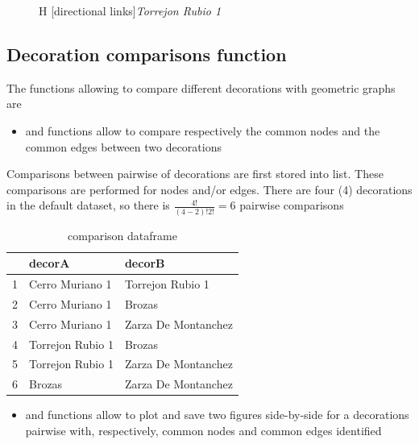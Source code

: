 \documentclass[article]{jss}\usepackage[]{graphicx}\usepackage[]{color}
\newenvironment{knitrout}{}{} %
\begin{document}
\begin{figure}{H}
\begin{knitrout}
\end{knitrout}
[directional links]{\emph{Torrejon Rubio 1}}
\end{figure}

\subsection{Decoration comparisons function} \label{sec:functions_one}

The functions allowing to compare different decorations with geometric graphs are

\begin{itemize}
  \item {} and  functions allow to compare respectively the common nodes and the common edges between two decorations
\end{itemize}

Comparisons between pairwise of decorations are first stored into list. These comparisons are performed for nodes and/or edges. There are four (4) decorations in the default dataset, so there is $\frac{4!}{(4-2)!2!}={6}$ pairwise comparisons

\begin{table}[ht]
\centering
\begin{tabular}{rll}
  \hline
 & decorA & decorB \\ 
  \hline
1 & Cerro Muriano 1 & Torrejon Rubio 1 \\ 
  2 & Cerro Muriano 1 & Brozas \\ 
  3 & Cerro Muriano 1 & Zarza De Montanchez \\ 
  4 & Torrejon Rubio 1 & Brozas \\ 
  5 & Torrejon Rubio 1 & Zarza De Montanchez \\ 
  6 & Brozas & Zarza De Montanchez \\ 
   \hline
\end{tabular}
\caption{comparison dataframe} 
\label{Test_table_1}
\end{table}



\begin{itemize}  
  \item {} and  functions allow to plot and save two figures side-by-side for a decorations pairwise with, respectively, common nodes and common edges identified
\end{itemize}
\end{document}
